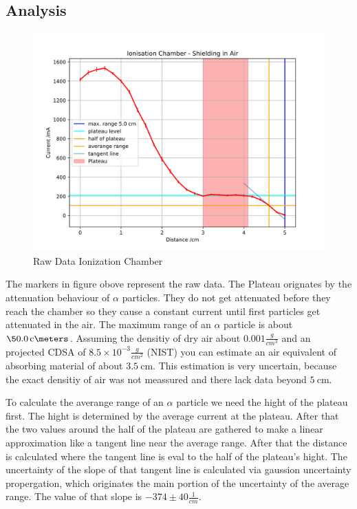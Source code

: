 \documentclass[12pt,twoside,a4paper]{scrartcl}
\begin{document}
	\subsection{Analysis}

		\begin{figure}[H]
			\includegraphics{Plots/ionisation_chamber/CurrentToDistance.png}
			\caption{Raw Data Ionization Chamber}
		\end{figure}

    The markers in figure obove represent the raw data. The Plateau orignates by
    the attenuation behaviour of $\alpha$ particles. They do not get attenuated
    before they reach the chamber so they cause a constant current until first particles
    get attenuated in the air. The maximum range of an $\alpha$ particle is about
    $\SI{\5.0}{\centi\meters}$. Assuming the densitiy of dry air about $0.001\frac{g}{cm^3}$
    and an projected CDSA of $8.5\times10^{-3}\frac{g}{cm^2}$ (NIST) you can estimate an
    air equivalent of absorbing material of about $\SI{3.5}{\centi\meter}$. This
    estimation is very uncertain, because the exact densitiy of air was not meassured and
    there lack data beyond $\SI{5}{\centi\meter}$.

    To calculate the averange range of an $\alpha$ particle we need the hight of the plateau
    first. The hight is determined by the average current at the plateau. After that
    the two values around the half of the plateau are gathered to make a linear
    approximation like a tangent line near the average range. After that the distance
    is calculated where the tangent line is eval to the half of the plateau's hight.
    The uncertainty of the slope of that tangent line is calculated via gaussion
    uncertainty propergation, which originates the main portion of the uncertainty
    of the average range. The value of that slope is $-374 \pm 40\frac{1}{cm}$.
\end{document}
